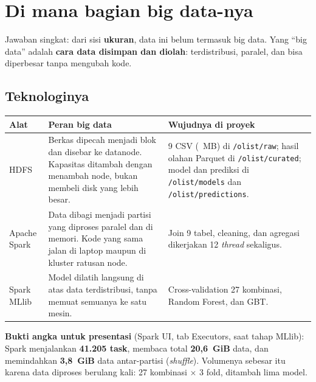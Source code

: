\documentclass[11pt,a4paper]{article}
\newcommand{\f}[1]{\texttt{#1}}
\begin{document}
\section{Di mana bagian big data-nya}
Jawaban singkat: dari sisi \textbf{ukuran}, data ini belum termasuk big data. Yang
``big data'' adalah \textbf{cara data disimpan dan diolah}: terdistribusi, paralel, dan
bisa diperbesar tanpa mengubah kode.

\subsection{Teknologinya}
\begin{tabularx}{\textwidth}{P{2.3cm}YY}
\toprule
Alat & Peran big data & Wujudnya di proyek \\
\midrule
HDFS & Berkas dipecah menjadi blok dan disebar ke datanode. Kapasitas ditambah dengan
menambah node, bukan membeli disk yang lebih besar. &
9 CSV (\rawSizeMB{}~MB) di \f{/olist/raw}; hasil olahan Parquet di \f{/olist/curated};
model dan prediksi di \f{/olist/models} dan \f{/olist/predictions}. \\
Apache Spark & Data dibagi menjadi partisi yang diproses paralel dan di memori. Kode yang
sama jalan di laptop maupun di kluster ratusan node. &
Join 9 tabel, cleaning, dan agregasi dikerjakan 12 \emph{thread} sekaligus. \\
Spark MLlib & Model dilatih langsung di atas data terdistribusi, tanpa memuat semuanya
ke satu mesin. &
Cross-validation 27 kombinasi, Random Forest, dan GBT. \\
\bottomrule
\end{tabularx}

\textbf{Bukti angka untuk presentasi} (Spark UI, tab Executors, saat tahap MLlib): Spark
menjalankan \textbf{41.205 task}, membaca total \textbf{20,6~GiB} data, dan memindahkan
\textbf{3,8~GiB} data antar-partisi (\emph{shuffle}). Volumenya sebesar itu karena data
diproses berulang kali: 27 kombinasi $\times$ 3 fold, ditambah lima model.
\end{document}

